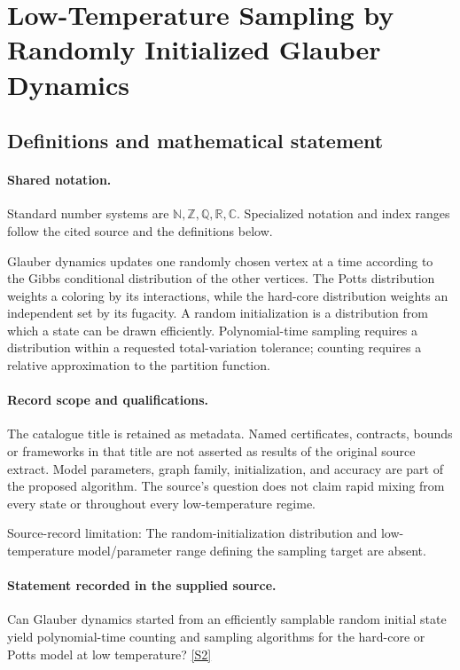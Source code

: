 \documentclass[11pt]{article}
\newcommand{\sref}[2]{\hyperlink{source:#1:#2}{[S#2]}}
\begin{document}
\section{Low-Temperature Sampling by Randomly Initialized Glauber Dynamics}\label{statement}

\subsection{Definitions and mathematical statement}

\paragraph{Shared notation.}Standard number systems are $\mathbb N,\mathbb Z,\mathbb Q,\mathbb R,\mathbb C$. Specialized notation and index ranges follow the cited source and the definitions below.


Glauber dynamics updates one randomly chosen vertex at a time according to the Gibbs conditional distribution of the other vertices. The Potts distribution weights a coloring by its interactions, while the hard-core distribution weights an independent set by its fugacity. A random initialization is a distribution from which a state can be drawn efficiently. Polynomial-time sampling requires a distribution within a requested total-variation tolerance; counting requires a relative approximation to the partition function.
\paragraph{Record scope and qualifications.}
The catalogue title is retained as metadata. Named certificates, contracts, bounds or frameworks in that title are not asserted as results of the original source extract.
Model parameters, graph family, initialization, and accuracy are part of the proposed algorithm. The source's question does not claim rapid mixing from every state or throughout every low-temperature regime.

Source-record limitation: The random-initialization distribution and low-temperature model/parameter range defining the sampling target are absent.
\paragraph{Statement recorded in the supplied source.}
Can Glauber dynamics started from an efficiently samplable random initial state yield polynomial-time counting and sampling algorithms for the hard-core or Potts model at low temperature? \sref{statement}{2}
\end{document}
